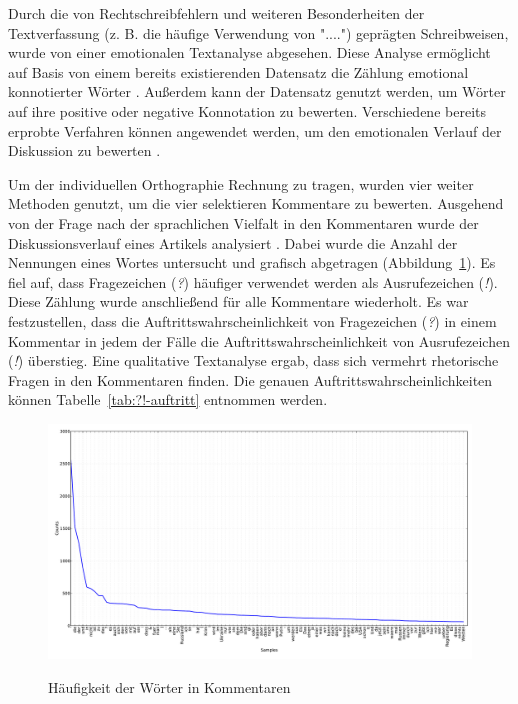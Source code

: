 \documentclass[12pt,a4paper,oneside]{article}
\begin{document}
\begin{titlepage}
\begin{flushleft}
\begin{singlespace}
\end{singlespace}






Durch die von Rechtschreibfehlern und weiteren Besonderheiten der Textverfassung (z. B. die häufige Verwendung von "....") geprägten Schreibweisen, wurde von einer emotionalen Textanalyse abgesehen. Diese Analyse ermöglicht auf Basis von einem bereits existierenden Datensatz die Zählung emotional konnotierter Wörter \cite{BAWLR}. Außerdem kann der Datensatz genutzt werden, um  Wörter auf ihre positive oder negative Konnotation zu bewerten. Verschiedene bereits erprobte Verfahren können angewendet werden, um den emotionalen Verlauf der Diskussion zu bewerten \cite{vo2006cross,vo2009berlin}.

Um der individuellen Orthographie Rechnung zu tragen, wurden vier weiter Methoden genutzt, um die  vier selektieren Kommentare zu bewerten. Ausgehend von der Frage nach der sprachlichen Vielfalt in den Kommentaren wurde der Diskussionsverlauf eines Artikels analysiert \cite{eemueller}. Dabei wurde die Anzahl der Nennungen eines Wortes untersucht und grafisch abgetragen (Abbildung~\ref{fig:python-worddensity}). Es fiel auf, dass Fragezeichen (\textit{?}) häufiger verwendet werden als Ausrufezeichen (\textit{!}). Diese Zählung wurde anschließend für alle Kommentare wiederholt. Es war festzustellen, dass die Auftrittswahrscheinlichkeit von Fragezeichen (\textit{?}) in einem Kommentar in jedem der Fälle die Auftrittswahrscheinlichkeit von Ausrufezeichen (\textit{!}) überstieg. Eine qualitative Textanalyse ergab, dass sich vermehrt rhetorische Fragen in den Kommentaren finden. Die genauen Auftrittswahrscheinlichkeiten können Tabelle~\ref{tab:?!-auftritt} entnommen werden.

\newpage

\begin{landscape}
\begin{figure}[h!]
\includegraphics[height=.85\textheight]{100_most_kommentar-text.pdf}
\caption{Häufigkeit der Wörter in Kommentaren}\cite{Greven2014Zeit}
\label{fig:python-worddensity}
\end{figure}
\end{landscape}
\newpage


\end{flushleft}
\end{titlepage}
\end{document}
